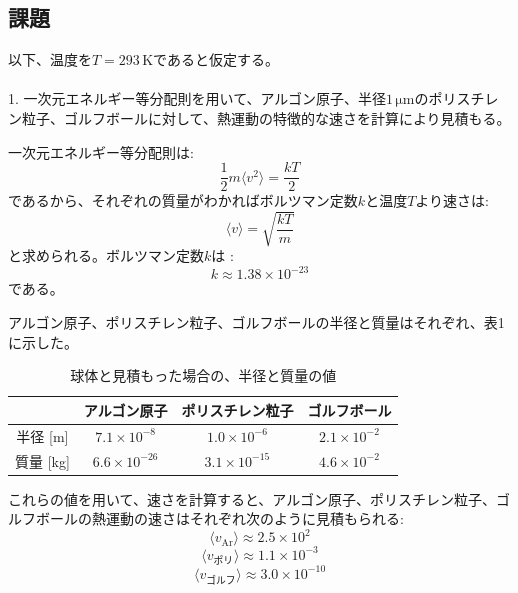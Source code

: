 \documentclass[a4paper,10pt]{jsarticle}
\begin{document}
\subsection*{課題}
以下、温度を$T = 293 \, \mathrm{K}$であると仮定する。\\\\
1. 一次元エネルギー等分配則を用いて、アルゴン原子、半径$1 \, \text{μ}\mathrm{m}$のポリスチレン粒子、ゴルフボールに対して、熱運動の特徴的な速さを計算により見積もる。

一次元エネルギー等分配則は:
\begin{equation}
\frac{1}{2} m\langle v^2 \rangle = \frac{kT}{2}
\end{equation}
であるから、それぞれの質量がわかればボルツマン定数$k$と温度$T$より速さは:
\begin{equation}
\langle v \rangle = \sqrt{\frac{kT}{m}}
\end{equation}
と求められる。ボルツマン定数$k$は :
\begin{equation}
k \approx 1.38 \times 10^{-23}
\end{equation}
である。

アルゴン原子、ポリスチレン粒子、ゴルフボールの半径と質量はそれぞれ、表1に示した。\\

\begin{center}
\begin{table}[ht]
\caption{球体と見積もった場合の、半径と質量の値}
\centering
\begin{tabular}{cccc}
  \hline
   & アルゴン原子 & ポリスチレン粒子 & ゴルフボール \\
  \hline
  半径 [m] & $7.1 \times 10^{-8}$ & $1.0 \times 10^{-6}$ & $2.1 \times 10^{-2}$ \\
  \hline
  質量 [kg] & $6.6 \times 10^{-26}$ & $3.1 \times 10^{-15}$ & $4.6 \times 10^{-2}$ \\
  \hline
\end{tabular}
\end{table}
\end{center}

これらの値を用いて、速さを計算すると、アルゴン原子、ポリスチレン粒子、ゴルフボールの熱運動の速さはそれぞれ次のように見積もられる:
\begin{equation}
  \langle v_{\text{Ar}} \rangle \approx 2.5 \times 10^2
  \end{equation}
  \begin{equation}
  \langle v_{\text{ポリ}} \rangle \approx 1.1 \times 10^{-3}
  \end{equation}
  \begin{equation}
  \langle v_{\text{ゴルフ}} \rangle \approx 3.0 \times 10^{-10}
  \end{equation}
\end{document}
